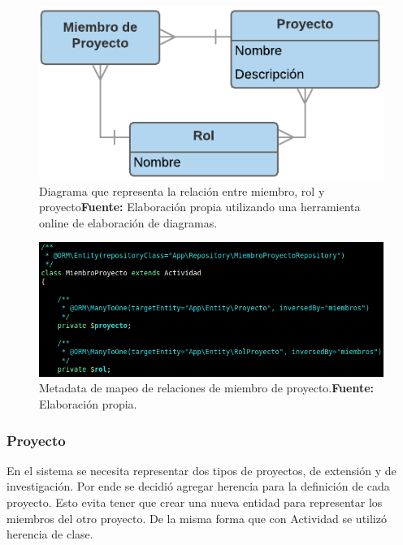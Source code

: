 \begin{figure}[h]
    \includegraphics[width=1\linewidth]{image/mpr-new.png}
    \caption{Diagrama que representa la relación entre miembro, rol y proyecto\newline \textbf{Fuente:} Elaboración propia utilizando una herramienta online de elaboración de diagramas.}
    \label{fig:image/mpr-new}
\end{figure}

\begin{figure}[h]
    \includegraphics[width=1\linewidth]{image/miembros.png}
    \caption{Metadata de mapeo de relaciones de miembro de proyecto.\newline \textbf{Fuente:} Elaboración propia.}
    \label{fig:image/miembros}
\end{figure}

\subsubsection{Proyecto}%
\label{ssub:modelo_proyecto}
En el sistema se necesita representar dos tipos de proyectos, de extensión y de investigación\@. Por ende se decidió agregar herencia para la definición de
cada proyecto\@. Esto evita tener que crear una nueva entidad para representar los miembros del otro proyecto\@. De la misma forma que con Actividad se utilizó
herencia de clase.


